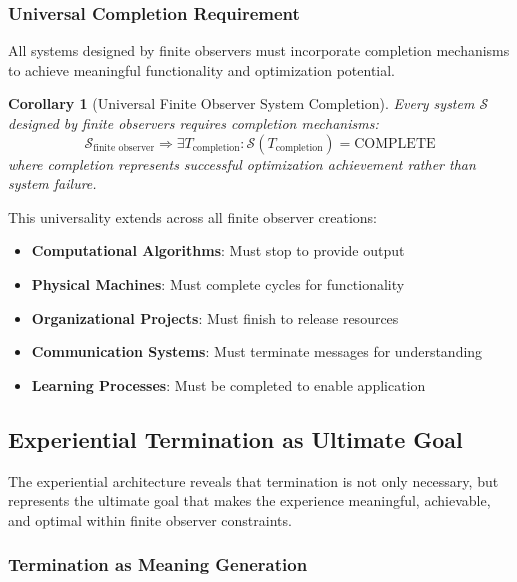 \documentclass{article}
\newtheorem{corollary}[theorem]{Corollary}
\begin{document}
\subsubsection{Universal Completion Requirement}

All systems designed by finite observers must incorporate completion mechanisms to achieve meaningful functionality and optimization potential.

\begin{corollary}[Universal Finite Observer System Completion]
Every system $\mathcal{S}$ designed by finite observers requires completion mechanisms:
\begin{equation}
\mathcal{S}_{\text{finite observer}} \Rightarrow \exists T_{\text{completion}}: \mathcal{S}(T_{\text{completion}}) = \text{COMPLETE}
\end{equation}
where completion represents successful optimization achievement rather than system failure.
\end{corollary}

This universality extends across all finite observer creations:
\begin{itemize}
\item \textbf{Computational Algorithms}: Must stop to provide output
\item \textbf{Physical Machines}: Must complete cycles for functionality  
\item \textbf{Organizational Projects}: Must finish to release resources
\item \textbf{Communication Systems}: Must terminate messages for understanding
\item \textbf{Learning Processes}: Must be completed to enable application
\end{itemize}

\subsection{Experiential Termination as Ultimate Goal}

The experiential architecture reveals that termination is not only necessary, but represents the ultimate goal that makes the experience meaningful, achievable, and optimal within finite observer constraints.

\subsubsection{Termination as Meaning Generation}
\end{document}

